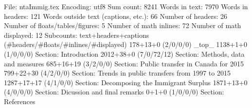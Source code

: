 File: ntaImmig.tex
Encoding: utf8
Sum count: 8241
Words in text: 7970
Words in headers: 121
Words outside text (captions, etc.): 66
Number of headers: 26
Number of floats/tables/figures: 5
Number of math inlines: 72
Number of math displayed: 12
Subcounts:
  text+headers+captions (#headers/#floats/#inlines/#displayed)
  178+13+0 (2/0/0/0) _top_
  1138+1+0 (1/0/0/0) Section: Introduction
  2012+38+0 (7/0/72/12) Section: Methods, data and measures 
  685+16+19 (3/2/0/0) Section: Public transfer in Canada for 2015
  799+22+30 (4/2/0/0) Section: Trends in public transfers from 1997 to 2015
  1287+17+17 (4/1/0/0) Section: Decomposing the Immigrant Surplus
  1871+13+0 (4/0/0/0) Section: Dicussion and final remarks
  0+1+0 (1/0/0/0) Section: References

